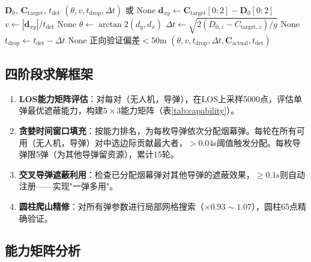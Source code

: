 \documentclass[12pt,a4paper]{ctexart}
\begin{document}
\begin{algorithm}[H]
\caption{逆运动学参数反算}
\begin{algorithmic}[1]
\Require $\mathbf{D}_0$, $\mathbf{C}_{\text{target}}$, $t_{\text{det}}$
\Ensure $(\theta, v, t_{\text{drop}}, \Delta t)$ 或 None
\State $\mathbf{d}_{xy} \gets \mathbf{C}_{\text{target}}[0:2] - \mathbf{D}_0[0:2]$
\State $v \gets |\mathbf{d}_{xy}| / t_{\text{det}}$
 \Return None \EndIf
\State $\theta \gets \arctan2(d_y, d_x)$
\State $\Delta t \gets \sqrt{2(D_{0,z} - C_{\text{target},z}) / g}$
 \Return None \EndIf
\State $t_{\text{drop}} \gets t_{\text{det}} - \Delta t$
 \Return None \EndIf
\State 正向验证偏差$<50$m
\State \Return $(\theta, v, t_{\text{drop}}, \Delta t, \mathbf{C}_{\text{actual}}, t_{\text{det}})$
\end{algorithmic}
\end{algorithm}

\subsection{四阶段求解框架}

\begin{enumerate}[label=阶段\arabic*:]
    \item \textbf{LOS能力矩阵评估}：对每对（无人机，导弹），在LOS上采样5000点，评估单弹最优遮蔽能力，构建$5\times3$能力矩阵（表\ref{tab:capability}）。

    \item \textbf{贪婪时间窗口填充}：按能力排名，为每枚导弹依次分配烟幕弹。每轮在所有可用（无人机，导弹）对中选边际贡献最大者，$>0.04$s阈值触发分配。每枚导弹限5弹（为其他导弹留资源），累计15轮。

    \item \textbf{交叉导弹遮蔽利用}：检查已分配烟幕弹对其他导弹的遮蔽效果，$\geq0.1$s则自动注册——实现"一弹多用"。

    \item \textbf{圆柱爬山精修}：对所有弹参数进行局部网格搜索（$\times0.93\sim1.07$），圆柱65点精确验证。
\end{enumerate}

\subsection{能力矩阵分析}
\end{document}
